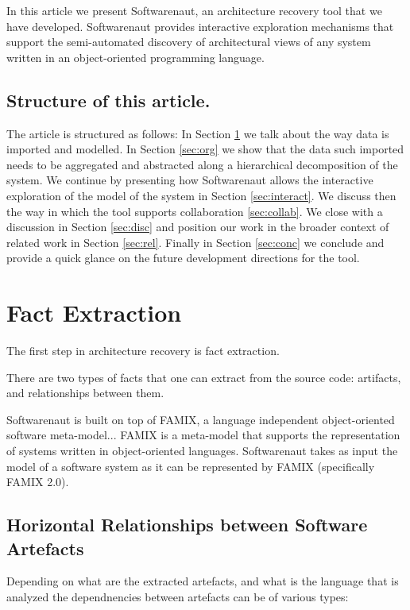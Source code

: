 \documentclass[preprint,12pt]{elsarticle}
\begin{document}
In this article we present Softwarenaut, an architecture recovery tool that we have developed. Softwarenaut provides interactive exploration mechanisms that support the semi-automated discovery of architectural views of any system written in an object-oriented programming language. 

\subsection*{Structure of this article.} The article is structured as follows: In Section \ref{sec:facts} we talk about the way data is imported and modelled. In Section \ref{sec:org} we show that the data such imported needs to be aggregated and abstracted along a hierarchical decomposition of the system. We continue by presenting how Softwarenaut allows the interactive exploration of the model of the system in Section \ref{sec:interact}. We discuss then the way in which the tool supports collaboration \ref{sec:collab}. We close with a discussion in Section \ref{sec:disc} and position our work in the broader context of related work in Section \ref{sec:rel}. Finally in Section \ref{sec:conc} we conclude and provide a quick glance on the future development directions for the tool. 



\section {Fact Extraction}
\label{sec:facts}

The first step in architecture recovery is fact extraction. 

There are two types of facts that one can extract from the source code: artifacts, and relationships between them. 

Softwarenaut is built on top of FAMIX, a language independent object-oriented software meta-model...
FAMIX is a meta-model that supports the representation of systems written in object-oriented languages. Softwarenaut takes as input the model of a software system as it can be represented by FAMIX (specifically FAMIX 2.0). 


\subsection {Horizontal Relationships between Software Artefacts}

Depending on what are the extracted artefacts, and what is the language that is analyzed the dependnencies between artefacts can be of various types:
\end{document}
